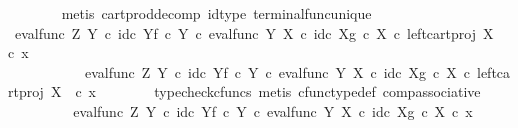 \begin{isabellebody}
\ \ \ \ \ \ \isamarkupfalse%
\ {\isacharparenleft}{\kern0pt}metis\ cart{\isacharunderscore}{\kern0pt}prod{\isacharunderscore}{\kern0pt}decomp\ id{\isacharunderscore}{\kern0pt}type\ terminal{\isacharunderscore}{\kern0pt}func{\isacharunderscore}{\kern0pt}unique{\isacharparenright}{\kern0pt}\isanewline
\ \ \ \ \isamarkupfalse%
\ {\isachardoublequoteopen}{\isacharparenleft}{\kern0pt}{\isacharparenleft}{\kern0pt}{\isacharparenleft}{\kern0pt}eval{\isacharunderscore}{\kern0pt}func\ Z\ Y\ {\isasymcirc}\isactrlsub c\ {\isasymlangle}id\isactrlsub c\ Y{\isacharcomma}{\kern0pt}f\ {\isasymcirc}\isactrlsub c\ {\isasymbeta}\isactrlbsub Y\isactrlesub {\isasymrangle}{\isacharparenright}{\kern0pt}\ {\isasymcirc}\isactrlsub c\ eval{\isacharunderscore}{\kern0pt}func\ Y\ X\ {\isasymcirc}\isactrlsub c\ {\isasymlangle}id\isactrlsub c\ X{\isacharcomma}{\kern0pt}g\ {\isasymcirc}\isactrlsub c\ {\isasymbeta}\isactrlbsub X\isactrlesub {\isasymrangle}{\isacharparenright}{\kern0pt}\ {\isasymcirc}\isactrlsub c\ left{\isacharunderscore}{\kern0pt}cart{\isacharunderscore}{\kern0pt}proj\ X\ {\isasymone}{\isacharparenright}{\kern0pt}\ {\isasymcirc}\isactrlsub c\ x{}\ {\isacharequal}{\kern0pt}\ \isanewline
\ \ \ \ \ \ \ \ \ \ \ {\isacharparenleft}{\kern0pt}{\isacharparenleft}{\kern0pt}eval{\isacharunderscore}{\kern0pt}func\ Z\ Y\ {\isasymcirc}\isactrlsub c\ {\isasymlangle}id\isactrlsub c\ Y{\isacharcomma}{\kern0pt}f\ {\isasymcirc}\isactrlsub c\ {\isasymbeta}\isactrlbsub Y\isactrlesub {\isasymrangle}{\isacharparenright}{\kern0pt}\ {\isasymcirc}\isactrlsub c\ eval{\isacharunderscore}{\kern0pt}func\ Y\ X\ {\isasymcirc}\isactrlsub c\ {\isasymlangle}id\isactrlsub c\ X{\isacharcomma}{\kern0pt}g\ {\isasymcirc}\isactrlsub c\ {\isasymbeta}\isactrlbsub X\isactrlesub {\isasymrangle}{\isacharparenright}{\kern0pt}\ {\isasymcirc}\isactrlsub c\ left{\isacharunderscore}{\kern0pt}cart{\isacharunderscore}{\kern0pt}proj\ X\ {\isasymone}\ {\isasymcirc}\isactrlsub c\ x{}{\isachardoublequoteclose}\isanewline
\ \ \ \ \ \ \isamarkupfalse%
\ {\isacharparenleft}{\kern0pt}typecheck{\isacharunderscore}{\kern0pt}cfuncs{\isacharcomma}{\kern0pt}\ metis\ cfunc{\isacharunderscore}{\kern0pt}type{\isacharunderscore}{\kern0pt}def\ comp{\isacharunderscore}{\kern0pt}associative{\isacharparenright}{\kern0pt}\isanewline
\ \ \ \ \isamarkupfalse%
\ \isamarkupfalse%
\ {\isachardoublequoteopen}{\isachardot}{\kern0pt}{\isachardot}{\kern0pt}{\isachardot}{\kern0pt}\ {\isacharequal}{\kern0pt}\ {\isacharparenleft}{\kern0pt}{\isacharparenleft}{\kern0pt}eval{\isacharunderscore}{\kern0pt}func\ Z\ Y\ {\isasymcirc}\isactrlsub c\ {\isasymlangle}id\isactrlsub c\ Y{\isacharcomma}{\kern0pt}f\ {\isasymcirc}\isactrlsub c\ {\isasymbeta}\isactrlbsub Y\isactrlesub {\isasymrangle}{\isacharparenright}{\kern0pt}\ {\isasymcirc}\isactrlsub c\ eval{\isacharunderscore}{\kern0pt}func\ Y\ X\ {\isasymcirc}\isactrlsub c\ {\isasymlangle}id\isactrlsub c\ X{\isacharcomma}{\kern0pt}g\ {\isasymcirc}\isactrlsub c\ {\isasymbeta}\isactrlbsub X\isactrlesub {\isasymrangle}{\isacharparenright}{\kern0pt}\ {\isasymcirc}\isactrlsub c\ x{\isachardoublequoteclose}\isanewline

\end{isabellebody}
